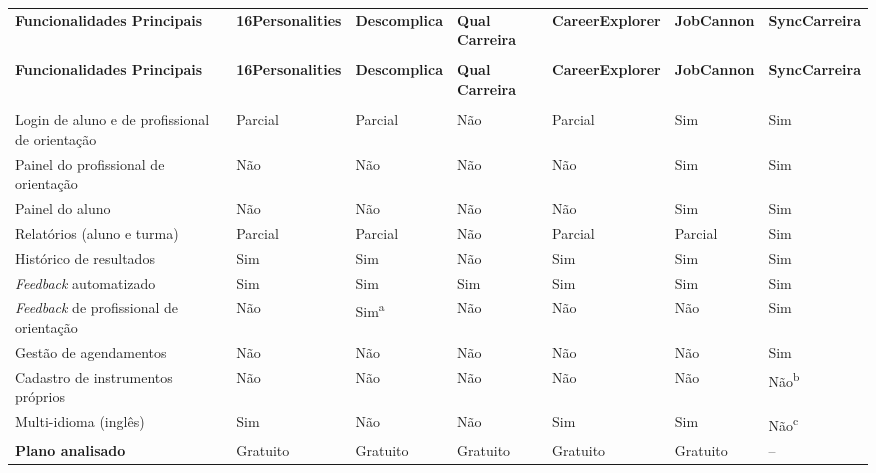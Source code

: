 {\ABNTEXfontereduzida
\renewcommand{\arraystretch}{1.3}
\begin{xltabular}{\textwidth}{|>{\raggedright\arraybackslash}p{3.4cm}|*{6}{>{\centering\arraybackslash}X|}}
 \\[0.3em]
\hline
\textbf{Funcionalidades Principais} & \textbf{16Perso\-nalities} & \textbf{Descom\-plica} & \textbf{Qual Carreira} & \textbf{Career\-Explorer} & \textbf{Job\-Cannon} & \textbf{Sync\-Carreira} \\
\hline
\endfirsthead
{} \\
\hline
\textbf{Funcionalidades Principais} & \textbf{16Perso\-nalities} & \textbf{Descom\-plica} & \textbf{Qual Carreira} & \textbf{Career\-Explorer} & \textbf{Job\-Cannon} & \textbf{Sync\-Carreira} \\
\hline
\endhead
{} \\
\endfoot
\endlastfoot
Login de aluno e de profissional de orientação & Parcial & Parcial & Não & Parcial & Sim & Sim \\
\hline
Painel do profissional de orientação & Não & Não & Não & Não & Sim & Sim \\
\hline
Painel do aluno & Não & Não & Não & Não & Sim & Sim \\
\hline
Relatórios (aluno e turma) & Parcial & Parcial & Não & Parcial & Parcial & Sim \\
\hline
Histórico de resultados & Sim & Sim & Não & Sim & Sim & Sim \\
\hline
\textit{Feedback} automatizado & Sim & Sim & Sim & Sim & Sim & Sim \\
\hline
\textit{Feedback} de profissional de orientação & Não & Sim\textsuperscript{a} & Não & Não & Não & Sim \\
\hline
Gestão de agendamentos & Não & Não & Não & Não & Não & Sim \\
\hline
Cadastro de instrumentos próprios & Não & Não & Não & Não & Não & Não\textsuperscript{b} \\
\hline
Multi-idioma (inglês) & Sim & Não & Não & Sim & Sim & Não\textsuperscript{c} \\
\hline
\textbf{Plano analisado} & Gratuito & Gratuito & Gratuito & Gratuito & Gratuito & -- \\
\hline
\end{xltabular}
}


